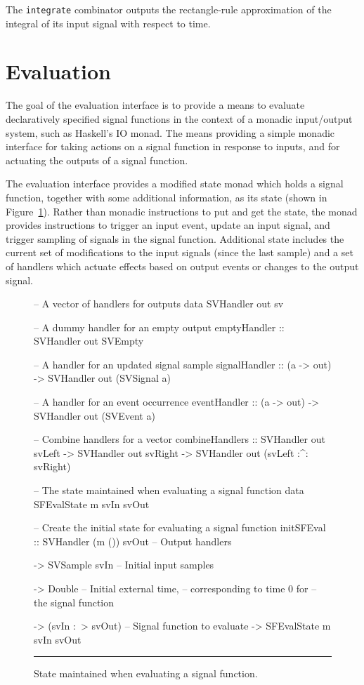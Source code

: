 The {\tt integrate} combinator outputs the rectangle-rule approximation of the
integral of its input signal with respect to time.

\section{Evaluation}
\label{section:System_Design_and_Interface-Evaluator}

The goal of the evaluation interface is to provide a means to evaluate
declaratively specified signal functions in the context of a monadic
input/output system, such as Haskell's IO monad. The means providing a simple
monadic interface for taking actions on a signal function in response to
inputs, and for actuating the outputs of a signal function.

The evaluation interface provides a modified state monad which holds a signal
function, together with some additional information, as its state (shown in
Figure~\ref{figure:evaluation_state}).
Rather than monadic instructions to put and get the state, the monad provides instructions
to trigger an input event, update an input signal, and trigger sampling of
signals in the signal function. Additional state includes the current set of
modifications to the input signals (since the last sample) and a set of
handlers which actuate effects based on output events or changes to the output
signal.

\begin{figure}
\begin{code}
-- A vector of handlers for outputs
data SVHandler out sv

-- A dummy handler for an empty output
emptyHandler    :: SVHandler out SVEmpty

-- A handler for an updated signal sample
signalHandler   :: (a -> out) -> SVHandler out (SVSignal a)

-- A handler for an event occurrence
eventHandler    :: (a -> out) -> SVHandler out (SVEvent a)

-- Combine handlers for a vector
combineHandlers ::    SVHandler out svLeft
                   -> SVHandler out svRight
                   -> SVHandler out (svLeft :^: svRight)

-- The state maintained when evaluating a signal function
data SFEvalState m svIn svOut

-- Create the initial state for evaluating a signal function
initSFEval ::    SVHandler (m ()) svOut   -- Output handlers

              -> SVSample svIn            -- Initial input samples
              
              -> Double                   -- Initial external time,
                                          -- corresponding to time 0 for
                                          -- the signal function
                                          
              -> (svIn :~> svOut)         -- Signal function to evaluate
              -> SFEvalState m svIn svOut
\end{code}
\hrule
\caption{State maintained when evaluating a signal function.}
\label{figure:evaluation_state}
\end{figure}

